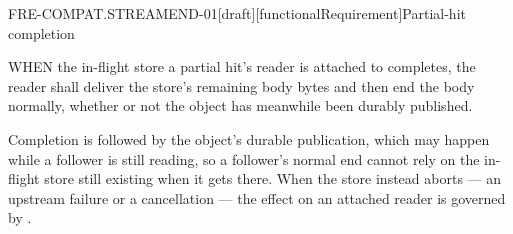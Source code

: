 \begin{requirement}{FRE-COMPAT.STREAMEND-01}[draft][functionalRequirement]{Partial-hit completion}


  WHEN the in-flight store a partial hit's reader is attached to completes,
  the reader shall deliver the store's remaining body bytes and then end the
  body normally, whether or not the object has meanwhile been durably
  published.

  Completion is followed by the object's durable publication, which may
  happen while a follower is still reading, so a follower's normal end cannot
  rely on the in-flight store still existing when it gets there. When the store instead
  aborts --- an upstream failure or a cancellation --- the effect on an
  attached reader is governed by
  .



\end{requirement}

